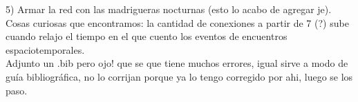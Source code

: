 \documentclass[12pt,screen,twoside,pagebackref]{ibtesis}
\begin{document}
5) Armar la red con las madrigueras nocturnas (esto lo acabo de agregar je).\\

Cosas curiosas que encontramos: la cantidad de conexiones a partir de 7 (?) sube cuando relajo el tiempo en el que cuento los eventos de encuentros espaciotemporales.\\
Adjunto un .bib pero ojo! que se que tiene muchos errores, igual sirve a modo de guía bibliográfica, no lo corrijan porque ya lo tengo corregido por ahi, luego se los paso.\\




  


    
    
    
    


%
%

%


\begin{biblio}
\nocite{*}

\end{biblio}


    

\end{document}
